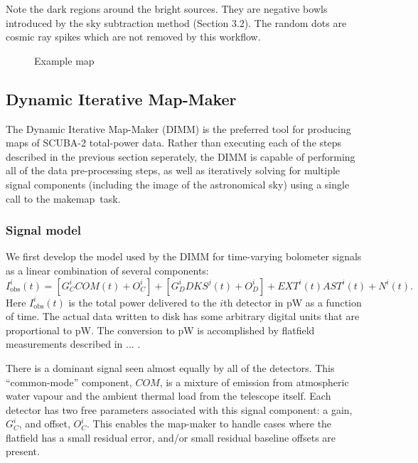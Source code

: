 \documentclass[twoside,11pt]{article}
\newcommand{\xref}[3]{#1}
\newcommand{\xlabel}[1]{}
\renewcommand{\_}{\texttt{\symbol{95}}}
\newcommand{\task}[1]{\textsf{#1}}
\newcommand{\makemap}{\xref{\task{makemap}}{sun258}{MAKEMAP}}
\begin{document}
Note the dark regions around the bright sources. They are negative
bowls introduced by the sky subtraction method (Section 3.2). The
random dots are cosmic ray spikes which are not removed by this
workflow.

\begin{figure}
\caption{Example map}
\end{figure}



\subsection{\xlabel{dimm}Dynamic Iterative Map-Maker\label{se:dimm}}

The Dynamic Iterative Map-Maker (DIMM) is the preferred tool for
producing maps of SCUBA-2 total-power data. Rather than executing each
of the steps described in the previous section seperately, the DIMM is
capable of performing all of the data pre-processing steps, as well as
iteratively solving for multiple signal components (including the
image of the astronomical sky) using a single call to the \makemap\
task. 

\subsubsection{Signal model}

We first develop the model used by the DIMM for time-varying bolometer
signals as a linear combination of several components:
%
\begin{equation}
I^i_{\mathrm{obs}}(t) = [G_C^i COM(t) + O_C^i] + [G_D^i DKS^j(t) + O_D^i] +
                      EXT^i(t) AST^i(t) + N^i(t).
\end{equation}
%
Here $I^i_{\mathrm{obs}}(t)$ is the total power delivered to the $i$th
detector in pW as a function of time. The actual data written to disk
has some arbitrary digital units that are proportional to pW. The
conversion to pW is accomplished by flatfield measurements described
in ... .

There is a dominant signal seen almost equally by all of the
detectors. This ``common-mode'' component, $COM$, is a mixture of
emission from atmospheric water vapour and the ambient thermal load
from the telescope itself. Each detector has two free parameters
associated with this signal component: a gain, $G_C^i$, and offset,
$O_C^i$. This enables the map-maker to handle cases where the
flatfield has a small residual error, and/or small residual baseline
offsets are present.
\end{document}
